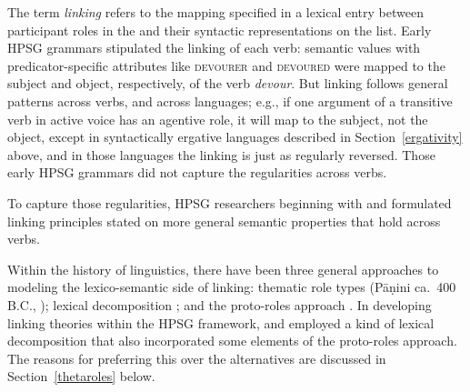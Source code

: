 \documentclass[output=paper,biblatex,babelshorthands,newtxmath,draftmode,colorlinks, citecolor=brown]{langscibook}
\begin{document}
The term \textit{linking} refers to the mapping specified in a lexical entry between participant
roles in the  and their syntactic representations on the \argst
list. Early HPSG grammars stipulated the linking of each verb: semantic \content values with
predicator-specific attributes like \textsc{devourer} and \textsc{devoured} were mapped to the
subject and object, respectively, of the verb \textit{devour}.  But linking follows general patterns
across verbs, and across languages; e.g., if one argument of a transitive verb in active voice has
an agentive role, it will map to the subject, not the object, except in syntactically ergative
languages described in Section~\ref{ergativity} above, and in those languages the linking is just as
regularly reversed.  Those early HPSG grammars did not capture the regularities across verbs.

\begin{sloppypar}
To capture those regularities, HPSG researchers beginning with \citet{Wechsler1995b} and
\citet{Davis1996} formulated linking principles stated on more general semantic properties that hold
across verbs.
\end{sloppypar}

\largerpage
Within the history of linguistics, there have been three general approaches to modeling the
lexico-semantic side of linking: thematic role types (P\={a}\d{n}ini ca.\ 400 B.C., \citealt{Fillmore1968}); lexical
decomposition \citep{FoleyandvanValin1984,RappaportandLevin1998}; and the
proto-roles approach
\citep{Dowty1991}.  In developing linking theories within the HPSG framework, \citet{Wechsler1995b}
and \citet{Davis1996} employed a kind of lexical decomposition that also incorporated some elements
of the proto-roles approach.  The reasons for preferring this over the alternatives are discussed in
Section~\ref{thetaroles} below.
\end{document}
